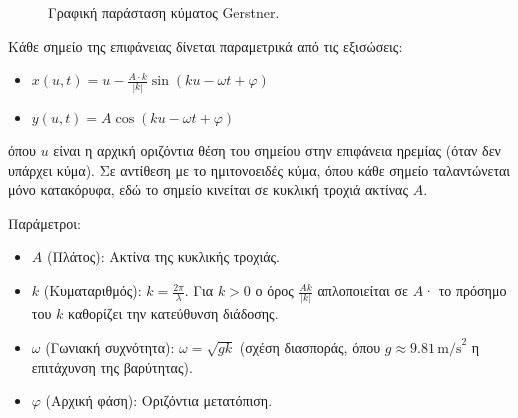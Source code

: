 \documentclass[a4paper, 11pt]{article}
\providecommand{\tightlist}{\setlength{\itemsep}{0pt}\setlength{\parskip}{0pt}}
\begin{document}
\begin{figure}[htbp]
\centering
{}
\caption{Γραφική παράσταση κύματος Gerstner.}
\label{fig:gerstner}
\end{figure}

Κάθε σημείο της επιφάνειας δίνεται παραμετρικά από τις εξισώσεις:

\begin{itemize}
\tightlist
\item
  \(x(u, t) = u - \frac{A \cdot k}{|k|} \sin(k u - \omega t + \varphi)\)
\item
  \(y(u, t) = A \cos(k u - \omega t + \varphi)\)
\end{itemize}

όπου \(u\) είναι η αρχική οριζόντια θέση του σημείου στην επιφάνεια
ηρεμίας (όταν δεν υπάρχει κύμα). Σε αντίθεση με το ημιτονοειδές κύμα,
όπου κάθε σημείο ταλαντώνεται μόνο κατακόρυφα, εδώ το σημείο κινείται σε
κυκλική τροχιά ακτίνας \(A\).

Παράμετροι:

\begin{itemize}
\tightlist
\item
  \(A\) (Πλάτος): Ακτίνα της κυκλικής τροχιάς.
\item
  \(k\) (Κυματαριθμός): \(k = \frac{2\pi}{\lambda}\). Για \(k>0\) ο όρος
  \(\frac{A k}{|k|}\) απλοποιείται σε \(A\)· το πρόσημο του \(k\)
  καθορίζει την κατεύθυνση διάδοσης.
\item
  \(\omega\) (Γωνιακή συχνότητα): \(\omega = \sqrt{g k}\) (σχέση
  διασποράς, όπου \(g\approx 9.81\,\text{m/s}^2\) η επιτάχυνση της
  βαρύτητας).
\item
  \(\varphi\) (Αρχική φάση): Οριζόντια μετατόπιση.
\end{itemize}
\end{document}
